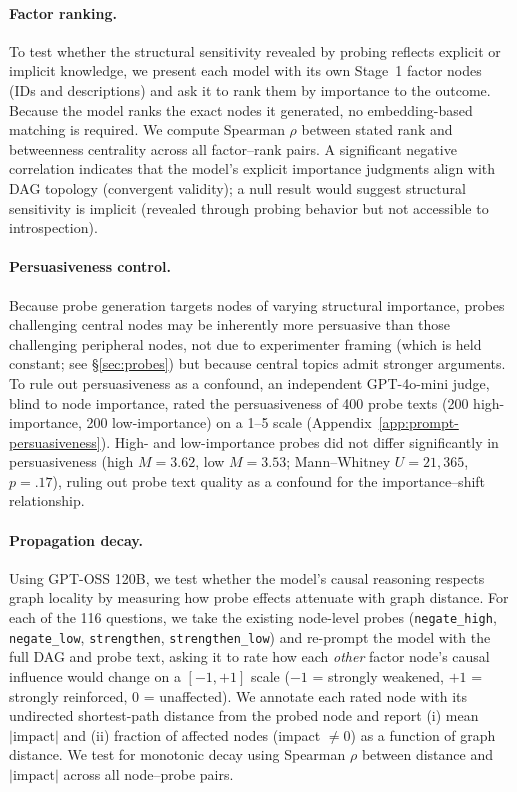 \documentclass[11pt]{article}
\begin{document}
\paragraph{Factor ranking.} To test whether the structural sensitivity revealed by probing reflects explicit or implicit knowledge, we present each model with its own Stage~1 factor nodes (IDs and descriptions) and ask it to rank them by importance to the outcome. Because the model ranks the exact nodes it generated, no embedding-based matching is required. We compute Spearman $\rho$ between stated rank and betweenness centrality across all factor--rank pairs. A significant negative correlation indicates that the model's explicit importance judgments align with DAG topology (convergent validity); a null result would suggest structural sensitivity is implicit (revealed through probing behavior but not accessible to introspection).

\paragraph{Persuasiveness control.} Because probe generation targets nodes of varying structural importance, probes challenging central nodes may be inherently more persuasive than those challenging peripheral nodes, not due to experimenter framing (which is held constant; see \S\ref{sec:probes}) but because central topics admit stronger arguments. To rule out persuasiveness as a confound, an independent GPT-4o-mini judge, blind to node importance, rated the persuasiveness of 400 probe texts (200 high-importance, 200 low-importance) on a 1--5 scale (Appendix~\ref{app:prompt-persuasiveness}). High- and low-importance probes did not differ significantly in persuasiveness (high $M = 3.62$, low $M = 3.53$; Mann--Whitney $U = 21{,}365$, $p = .17$), ruling out probe text quality as a confound for the importance--shift relationship.

\paragraph{Propagation decay.} Using GPT-OSS 120B, we test whether the model's causal reasoning respects graph locality by measuring how probe effects attenuate with graph distance. For each of the 116 questions, we take the existing node-level probes (\texttt{negate\_high}, \texttt{negate\_low}, \texttt{strengthen}, \texttt{strengthen\_low}) and re-prompt the model with the full DAG and probe text, asking it to rate how each \emph{other} factor node's causal influence would change on a $[-1, +1]$ scale ($-1$ = strongly weakened, $+1$ = strongly reinforced, $0$ = unaffected). We annotate each rated node with its undirected shortest-path distance from the probed node and report (i) mean $|\text{impact}|$ and (ii) fraction of affected nodes (impact $\neq 0$) as a function of graph distance. We test for monotonic decay using Spearman $\rho$ between distance and $|\text{impact}|$ across all node--probe pairs.
\end{document}
